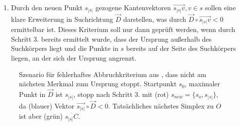 \begin{enumerate}
\begin{enumerate}
	\item Durch den neuen Punkt $s_{|s|}$ gezogene Kantenvektoren $\vec{s_{|s|}v}, v\in s$ sollen eine klare Erweiterung in Suchrichtung $\vec{D}$ darstellen, was durch $\vec{D} \circ \vec{s_{|s|}v} < 0$ ermittelbar ist. Dieses Kriterium soll nur dann geprüft werden, wenn durch Schritt 3. bereits ermittelt wurde, dass der Ursprung außerhalb des Suchkörpers liegt und die Punkte in $s$ bereits auf der Seite des Suchkörpers liegen, an der sich der Ursprung angrenzt.
\end{enumerate}

\begin{figure}
	\centering
	\caption{Szenario für fehlerhaftes Abbruchkriterium aus \cite{gjk-casey}, dass nicht am nächsten Merkmal zum Ursprung stoppt. Startpunkt $s_0$, maximaler Punkt in $\vec{D}$ ist $s_{|s|}$, stopp nach Schritt 3. mit (rot) $s_{new} = \{s_o, s_{|s|}\}$, da (blauer) Vektor $\vec{s_{|s|}}\circ\vec{D} < 0$. Tatsächliches nächstes Simplex zu $O$ ist aber (grün) $\overline{s_{|s|}C}$.}
	\label{fig:why_criteria}
\end{figure}

\begin{figure}
	\centering
\end{figure}
\end{enumerate}
